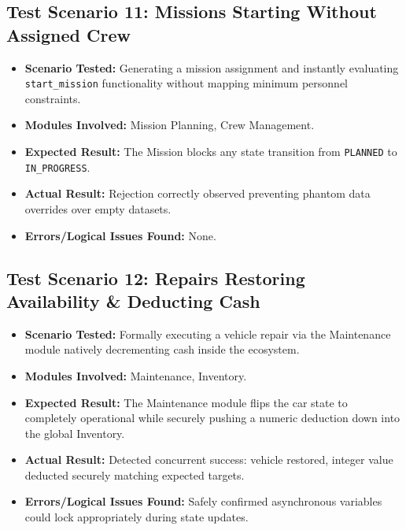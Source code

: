 \documentclass[12pt,a4paper]{article}
\begin{document}
\subsection{Test Scenario 11: Missions Starting Without Assigned Crew}
\begin{itemize}
    \item \textbf{Scenario Tested:} Generating a mission assignment and instantly evaluating \texttt{start\_mission} functionality without mapping minimum personnel constraints.
    \item \textbf{Modules Involved:} Mission Planning, Crew Management.
    \item \textbf{Expected Result:} The Mission blocks any state transition from \texttt{PLANNED} to \texttt{IN\_PROGRESS}.
    \item \textbf{Actual Result:} Rejection correctly observed preventing phantom data overrides over empty datasets.
    \item \textbf{Errors/Logical Issues Found:} None. 
\end{itemize}

\subsection{Test Scenario 12: Repairs Restoring Availability \& Deducting Cash}
\begin{itemize}
    \item \textbf{Scenario Tested:} Formally executing a vehicle repair via the Maintenance module natively decrementing cash inside the ecosystem.
    \item \textbf{Modules Involved:} Maintenance, Inventory.
    \item \textbf{Expected Result:} The Maintenance module flips the car state to completely operational while securely pushing a numeric deduction down into the global Inventory.
    \item \textbf{Actual Result:} Detected concurrent success: vehicle restored, integer value deducted securely matching expected targets.
    \item \textbf{Errors/Logical Issues Found:} Safely confirmed asynchronous variables could lock appropriately during state updates.
\end{itemize}
\end{document}
